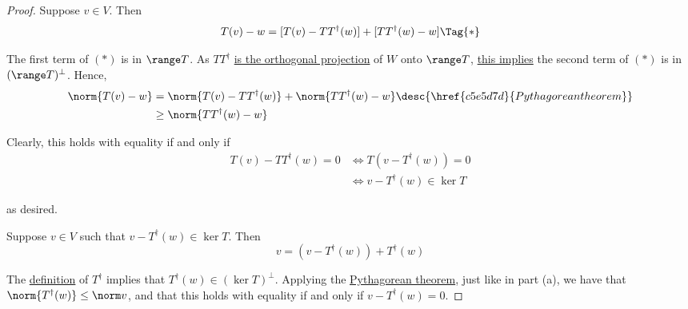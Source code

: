 \begin{proof}
   Suppose $v\in V$. Then
  \begin{equation*}
    T(v)-w=[T(v)-TT^\dagger(w)]+[TT^\dagger(w)-w]\Tag{*}
  \end{equation*}

  The first term of $(*)$ is in $\range T$. As $TT^\dagger$ \href{ea0037c}{is
  the orthogonal projection} of $W$ onto $\range T$, \href{f012eec}{this
  implies} the second term of $(*)$ is in $(\range T)^\perp$. Hence,
  \begin{align*}
    \norm{T(v)-w} &=\norm{T(v)-TT^\dagger(w)}+\norm{TT^\dagger(w)-w}\desc{\href{c5e5d7d}{Pythagorean theorem}} \\
                  &\geq\norm{TT^\dagger(w)-w}
  \end{align*}

  Clearly, this holds with equality if and only if
  \begin{align*}
    T(v)-TT^\dagger(w)=0 &\iff T(v-T^\dagger(w))=0     \\
                         &\iff v-T^\dagger(w)\in\ker T
  \end{align*}

  as desired.

   Suppose $v\in V$ such that $v-T^\dagger(w)\in\ker T$. Then
  $$
    v=(v-T^\dagger(w))+T^\dagger(w)
  $$

  The \href{ba879e1}{definition} of $T^\dagger$ implies that
  $T^\dagger(w)\in(\ker T)^\perp$. Applying the \href{c5e5d7d}{Pythagorean
  theorem}, just like in part (a), we have that $\norm{T^\dagger(w)}\leq\norm
  v$, and that this holds with equality if and only if $v-T^\dagger(w)=0$.
\end{proof}
